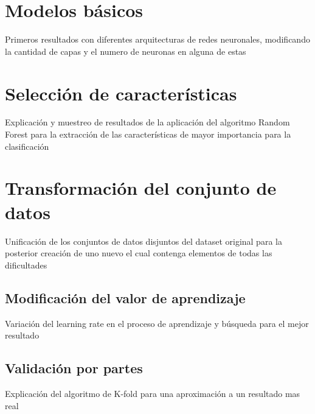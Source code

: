 \section{Modelos básicos}
Primeros resultados con diferentes arquitecturas de redes neuronales, modificando la cantidad de capas y el numero de neuronas en alguna de estas

\section{Selección de características}
Explicación y muestreo de resultados de la aplicación del algoritmo Random Forest para la extracción de las características de mayor importancia para la clasificación


\section{Transformación del conjunto de datos}
Unificación de los conjuntos de datos disjuntos del dataset original para la posterior creación de uno nuevo el cual contenga elementos de todas las dificultades

\subsection{Modificación del valor de aprendizaje}
Variación del learning rate en el proceso de aprendizaje y búsqueda para el mejor resultado

\subsection{Validación por partes}
Explicación del algoritmo de K-fold para una aproximación a un resultado mas real


